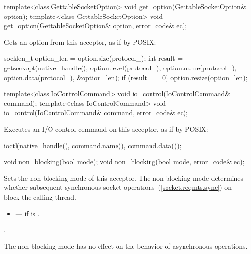 \begin{itemdecl}
template<class GettableSocketOption>
  void get_option(GettableSocketOption& option);
template<class GettableSocketOption>
  void get_option(GettableSocketOption& option, error_code& ec);
\end{itemdecl}

\begin{itemdescr}
\pnum
\effects Gets an option from this acceptor, as if by POSIX:
\begin{codeblock}
socklen_t option_len = option.size(protocol_);
int result = getsockopt(native_handle(), option.level(protocol_),
                        option.name(protocol_), option.data(protocol_),
                        &option_len);
if (result == 0)
  option.resize(option_len);
\end{codeblock}

\end{itemdescr}

\begin{itemdecl}
template<class IoControlCommand>
  void io_control(IoControlCommand& command);
template<class IoControlCommand>
  void io_control(IoControlCommand& command, error_code& ec);
\end{itemdecl}

\begin{itemdescr}
\pnum
\effects Executes an I/O control command on this acceptor, as if by POSIX:
\begin{codeblock}
ioctl(native_handle(), command.name(), command.data());
\end{codeblock}
\end{itemdescr}

\begin{itemdecl}
void non_blocking(bool mode);
void non_blocking(bool mode, error_code& ec);
\end{itemdecl}

\begin{itemdescr}
\pnum
\effects Sets the non-blocking mode of this acceptor. The non-blocking mode determines whether subsequent synchronous socket operations~(\ref{socket.reqmts.sync}) on  block the calling thread.

\pnum
\errors
\begin{itemize}
\item
{} --- if  is .
\end{itemize}

\pnum
\postconditions {}.

\pnum
 \begin{note} The non-blocking mode has no effect on the behavior of asynchronous operations. \end{note}
\end{itemdescr}

